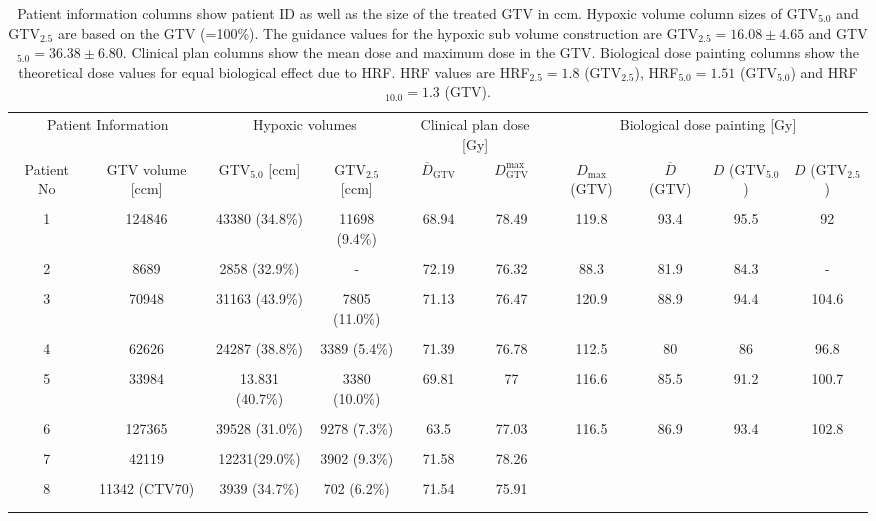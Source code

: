 \begin{sidewaystable}[p]
\centering
\footnotesize
\begin{tabular}{cccccccccc}
\toprule
\multicolumn{2}{c}{Patient Information} & \multicolumn{2}{c}{Hypoxic volumes} & \multicolumn{2}{c}{Clinical plan dose [Gy]} &  \multicolumn{4}{c}{Biological dose painting [Gy]}\\
\cmidrule(r){1-2} \cmidrule(r){3-4}\cmidrule(r){5-6}\cmidrule(r){7-10}
Patient No & GTV volume [ccm] & GTV$_{5.0}$ [ccm]& GTV$_{2.5}$ [ccm] & $\overline D_\mathrm{GTV}$ & $D_\mathrm{GTV}^\mathrm{max} $ & $D_\mathrm{max}$ (GTV) &  $\overline D$ (GTV) & $D$ (GTV$_{5.0}$) & $D$ (GTV$_{2.5}$)\\
\midrule\\
1	&	124846	&	43380 (34.8\%)	&	11698 (9.4\%)	&	68.94	&	78.49	&	119.8	&	93.4	&	95.5	&	92	\\\\
2	&	8689	&	2858 (32.9\%)	&	-	&	72.19	&	76.32	&	88.3	&	81.9	&	84.3	&	-	\\\\
3	&	70948	&	31163 (43.9\%)	&	7805 (11.0\%)	&	71.13	&	76.47	&	120.9	&	88.9	&	94.4	&	104.6	\\\\
4	&	62626	&	24287 (38.8\%)	&	3389 (5.4\%)	&	71.39	&	76.78	&	112.5	&	80	&	86	&	96.8	\\\\
5	&	33984	&	13.831 (40.7\%)	&	3380 (10.0\%)	&	69.81	&	77	&	116.6	&	85.5	&	91.2	&	100.7	\\\\
6	&	127365	&	39528 (31.0\%)	&	9278 (7.3\%)	&	63.5	&	77.03	&	116.5	&	86.9	&	93.4	&	102.8	\\\\
7	&	42119	&	12231(29.0\%)	&	3902 (9.3\%)	&	71.58	&	78.26	&		&		&		&		\\\\
8	&	11342 (CTV70)	&	3939 (34.7\%)	&	702 (6.2\%)	&	71.54	&	75.91	&		&		&		&		\\\\
\bottomrule\\
\end{tabular}
\caption{Patient information columns show patient ID as well as the size of the treated GTV in ccm. Hypoxic volume column sizes of GTV$_{5.0}$ and GTV$_{2.5}$ are based on the GTV (=100\%). The guidance values for the hypoxic sub volume construction are GTV$_{2.5}=16.08\pm 4.65$ and GTV$_{5.0}=36.38\pm 6.80$. Clinical plan columns show the mean dose and maximum dose in the GTV. Biological dose painting columns show the theoretical dose values for equal biological effect due to HRF. HRF values are HRF$_{2.5}=1.8$ (GTV$_{2.5}$), HRF$_{5.0}=1.51$ (GTV$_{5.0}$) and HRF$_{10.0}=1.3$ (GTV).}
\label{tab:patientgtv}
\end{sidewaystable}
